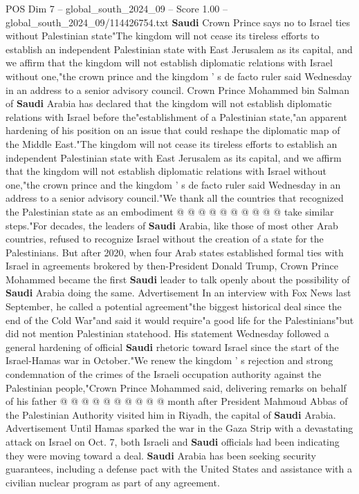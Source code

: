 \begin{textsample}{POS Dim 7 – global\_south\_2024\_09 – Score 1.00 – global\_south\_2024\_09/114426754.txt}  \label{ex:f7_pos_279}
\textbf{Saudi} Crown Prince says no to Israel ties without Palestinian state"The kingdom will not cease its tireless efforts to establish an independent Palestinian state with East Jerusalem as its capital, and we affirm that the kingdom will not establish diplomatic relations with Israel without one,"the crown prince and the kingdom ' s de facto ruler said Wednesday in an address to a senior advisory council.
Crown Prince Mohammed bin Salman of \textbf{Saudi} Arabia has declared that the kingdom will not establish diplomatic relations with Israel before the"establishment of a Palestinian state,"an apparent hardening of his position on an issue that could reshape the diplomatic map of the Middle East."The kingdom will not cease its tireless efforts to establish an independent Palestinian state with East Jerusalem as its capital, and we affirm that the kingdom will not establish diplomatic relations with Israel without one,"the crown prince and the kingdom ' s de facto ruler said Wednesday in an address to a senior advisory council."We thank all the countries that recognized the Palestinian state as an embodiment @ @ @ @ @ @ @ @ @ @ take similar steps."For decades, the leaders of \textbf{Saudi} Arabia, like those of most other Arab countries, refused to recognize Israel without the creation of a state for the Palestinians.
But after 2020, when four Arab states established formal ties with Israel in agreements brokered by then-President Donald Trump, Crown Prince Mohammed became the first \textbf{Saudi} leader to talk openly about the possibility of \textbf{Saudi} Arabia doing the same.
Advertisement In an interview with Fox News last September, he called a potential agreement"the biggest historical deal since the end of the Cold War"and said it would require"a good life for the Palestinians"but did not mention Palestinian statehood.
His statement Wednesday followed a general hardening of official \textbf{Saudi} rhetoric toward Israel since the start of the Israel-Hamas war in October."We renew the kingdom ' s rejection and strong condemnation of the crimes of the Israeli occupation authority against the Palestinian people,"Crown Prince Mohammed said, delivering remarks on behalf of his father @ @ @ @ @ @ @ @ @ @ month after President Mahmoud Abbas of the Palestinian Authority visited him in Riyadh, the capital of \textbf{Saudi} Arabia.
Advertisement Until Hamas sparked the war in the Gaza Strip with a devastating attack on Israel on Oct. 7, both Israeli and \textbf{Saudi} officials had been indicating they were moving toward a deal. \textbf{Saudi} Arabia has been seeking security guarantees, including a defense pact with the United States and assistance with a civilian nuclear program as part of any agreement.

\end{textsample}
